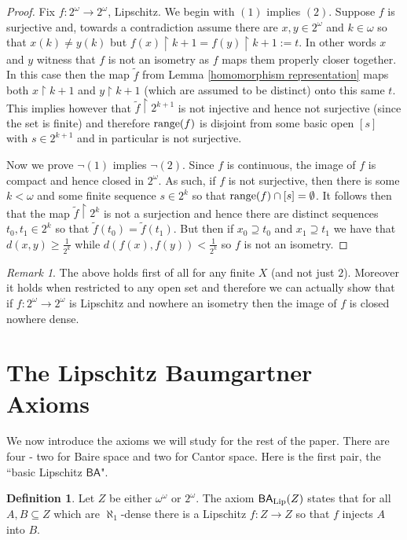 \documentclass[leqno,11pt]{amsart}
\theoremstyle{definition}
\newtheorem{definition}[theorem]{Definition}
\theoremstyle{remark}
\newtheorem{remark}{Remark}
\def\hook{\upharpoonright}
\def\BA{\mathsf{BA}}
\def\baire{\omega^\omega}
\def\cantor{2^\omega}
\begin{document}
\begin{proof}
    Fix $f:2^\omega \to 2^\omega$, Lipschitz. We begin with $(1)$ implies $(2)$. Suppose $f$ is surjective and, towards a contradiction assume there are $x, y \in 2^\omega$ and $k \in \omega$ so that $x(k) \neq y(k)$ but $f(x) \hook k+1 = f(y) \hook k+1 := t$. In other words $x$ and $y$ witness that $f$ is not an isometry as $f$ maps them properly closer together. In this case then the map $\tilde{f}$ from Lemma \ref{homomorphism representation} maps both $x \hook k+1$ and $y \hook k+1$ (which are assumed to be distinct) onto this same $t$. This implies however that $\tilde{f} \hook 2^{k+1}$ is not injective and hence not surjective (since the set is finite) and therefore ${\rm range}(f)$ is disjoint from some basic open $[s]$ with $s \in 2^{k+1}$ and in particular is not surjective. 

    Now we prove $\neg (1)$ implies $\neg (2)$. Since $f$ is continuous, the image of $f$ is compact and hence closed in $2^\omega$. As such, if $f$ is not surjective, then there is some $k < \omega$ and some finite sequence $s \in 2^k$ so that ${\rm range} (f) \cap [s] = \emptyset$. It follows then that the map $\tilde{f} \hook 2^k$ is not a surjection and hence there are distinct sequences $t_0, t_1 \in 2^k$ so that $\tilde{f}(t_0) = \tilde{f}(t_1)$. But then if $x_0 \supseteq t_0$ and $x_1 \supseteq t_1$ we have that $d(x, y) \geq \frac{1}{2^k}$ while $d(f(x), f(y)) < \frac{1}{2^k}$ so $f$ is not an isometry.
\end{proof}

\begin{remark}
    The above holds first of all for any finite $X$ (and not just $2$). Moreover it holds when restricted to any open set and therefore we can actually show that if $f:\cantor \to \cantor$ is Lipschitz and nowhere an isometry then the image of $f$ is closed nowhere dense.
\end{remark}

\section{The Lipschitz Baumgartner Axioms}

We now introduce the axioms we will study for the rest of the paper. There are four - two for Baire space and two for Cantor space. Here is the first pair, the ``basic Lipschitz $\BA$".

\begin{definition} \label{BAlipDef1}
    Let $Z$ be either $\baire$ or $\cantor$. The axiom $\BA_{\rm Lip}(Z)$ states that for all $A, B \subseteq Z$ which are $\aleph_1$-dense there is a Lipschitz $f:Z \to Z$ so that $f$ injects $A$ into $B$. 
\end{definition}
\end{document}
